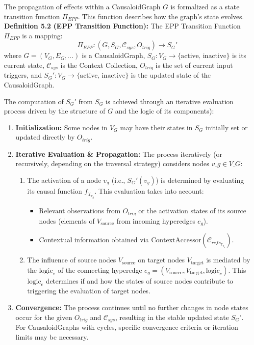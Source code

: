 \begin{definition}
\label{def:epp_input}     
    The propagation of effects within a CausaloidGraph \(G\) is formalized as a state transition function \(\Pi_{EPP}\). This function describes how the graph's state evolves.
    \textbf{Definition 5.2 (EPP Transition Function):} The EPP Transition Function \(\Pi_{EPP}\) is a mapping:
    \[ \Pi_{EPP} : (G, S_G, \mathcal{C}_{sys}, O_{trig}) \to S_G' \]
    where \(G=(V_G, E_G, \dots)\) is a CausaloidGraph, \(S_G: V_G \to \{\text{active, inactive}\}\) is its current state, \(\mathcal{C}_{sys}\) is the Context Collection, \(O_{trig}\) is the set of current input triggers, and \(S_G': V_G \to \{\text{active, inactive}\}\) is the updated state of the CausaloidGraph.

    The computation of \(S_G'\) from \(S_G\) is achieved through an iterative evaluation process driven by the structure of \(G\) and the logic of its components):
    \begin{enumerate}
        \item \textbf{Initialization:} Some nodes in \(V_G\) may have their states in \(S_G\) initially set or updated directly by \(O_{trig}\).
        \item \textbf{Iterative Evaluation \& Propagation:} The process iteratively (or recursively, depending on the traversal strategy) considers nodes \(v\_g \in V\_G\):
            \begin{enumerate}
                \item The activation of a node \(v_g\) (i.e., \(S_G'(v_g)\)) is determined by evaluating its causal function \(f_{\chi_{v_g}}\). This evaluation takes into account:
                    \begin{itemize}
                        \item Relevant observations from \(O_{trig}\) or the activation states of its source nodes (elements of \(V_{\text{source}}\) from incoming hyperedges \(e_g\)).
                        \item Contextual information obtained via \(\text{ContextAccessor}(\mathcal{C}_{refs_{\chi_{v_g}}})\).
                    \end{itemize}
                \item The influence of source nodes \(V_{\text{source}}\) on target nodes \(V_{\text{target}}\) is mediated by the \(\text{logic}_e\) of the connecting hyperedge \(e_g = (V_{\text{source}}, V_{\text{target}}, \text{logic}_e)\). This \(\text{logic}_e\) determines if and how the states of source nodes contribute to triggering the evaluation of target nodes.
            \end{enumerate}
        \item \textbf{Convergence:} The process continues until no further changes in node states occur for the given \(O_{trig}\) and \(\mathcal{C}_{sys}\), resulting in the stable updated state \(S_G'\). For CausaloidGraphs with cycles, specific convergence criteria or iteration limits may be necessary.
    \end{enumerate}
 \end{definition}   
    
